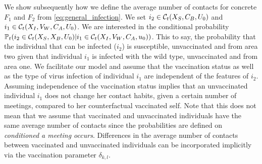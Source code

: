 We show subsequently how we define the average number of contacts for concrete $F_1$ and $F_2$ from \eqref{eq:general_infection}. We set $i_2 \in \mathcal{C}_t(X_S, C_B, U_0)$ and $i_1 \in \mathcal{C}_t(X_I, V_W, C_A, U_0)$. We are interested in the conditional probability $\mathbb{P}_t(i_2 \in \mathcal{C}_t(X_S, X_B, U_0)|i_1 \in \mathcal{C}_t(X_I, V_W, C_A, u_0))$. This to say, the probability that the individual that can be infected ($i_2$) is susceptible, unvaccinated and from area two given that individual $i_1$ is infected with the wild type, unvaccinated and from area one. We facilitate our model and assume that the vaccination status as well as the type of virus infection of individual $i_1$ are independent of the features of $i_2$. Assuming independence of the vaccination status implies that an unvaccinated individual $i_1$ does not change her contact habits, given a certain number of meetings, compared to her counterfactual vaccinated self. Note that this does not mean that we assume that vaccinated and unvaccinated individuals have the same average number of contacts since the probabilities are defined on \textit{conditioned a meeting occurs}. Differences in the average number of contacts between vaccinated and unvaccinated individuals can be incorporated implicitly via the vaccination parameter $\delta_{k,l}$.\\ 

